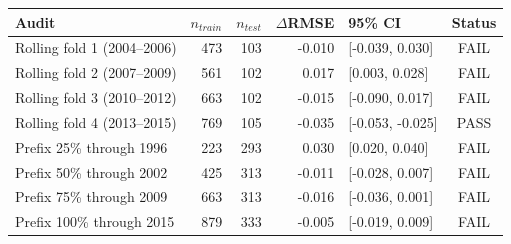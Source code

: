\begin{tabular}{lrrrlc}
\toprule
Audit & $n_{train}$ & $n_{test}$ & $\Delta$RMSE & 95\% CI & Status \\
\midrule
Rolling fold 1 (2004--2006) & 473 & 103 & -0.010 & [-0.039, 0.030] & FAIL \\
Rolling fold 2 (2007--2009) & 561 & 102 & 0.017 & [0.003, 0.028] & FAIL \\
Rolling fold 3 (2010--2012) & 663 & 102 & -0.015 & [-0.090, 0.017] & FAIL \\
Rolling fold 4 (2013--2015) & 769 & 105 & -0.035 & [-0.053, -0.025] & PASS \\
Prefix 25\% through 1996 & 223 & 293 & 0.030 & [0.020, 0.040] & FAIL \\
Prefix 50\% through 2002 & 425 & 313 & -0.011 & [-0.028, 0.007] & FAIL \\
Prefix 75\% through 2009 & 663 & 313 & -0.016 & [-0.036, 0.001] & FAIL \\
Prefix 100\% through 2015 & 879 & 333 & -0.005 & [-0.019, 0.009] & FAIL \\
\bottomrule
\end{tabular}
